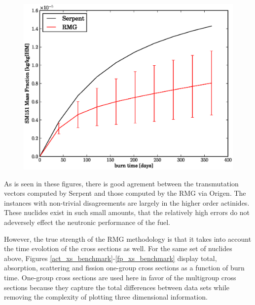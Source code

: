 \begin{figure}[htbp]
\begin{center}
\includegraphics[scale=0.3]{multigroup_method/figs/benchmark/SM151_Mass_Fraction_.eps}
\end{center}
\end{figure}


As is seen in these figures, there is good agrement between the transmutation vectors computed by
Serpent and those computed by the RMG via Origen.  The instances with non-trivial disagreements are 
largely in the higher order actinides.  These nuclides exist in such small amounts, that the relatively
high errors do not adeversely effect the neutronic performance of the fuel.

However, the true strength of the RMG methodology is 
that it takes into account the time evolotion of the cross sections as well.  For the same set 
of nuclides above, Figures \ref{act_xs_benchmark}-\ref{fp_xs_benchmark} display total, absorption,
scattering and fission one-group cross sections as a function of burn time.  One-group cross sections 
are used here in favor of the multigroup cross sections because they capture the total differences 
between data sets while removing the complexity of plotting three dimensional information.

